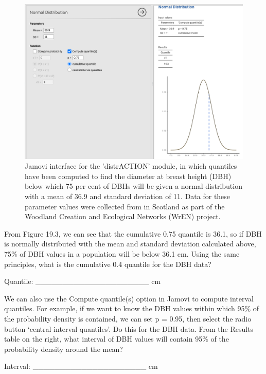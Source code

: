 \documentclass[
]{scrbook}
\begin{document}
\begin{figure}
\includegraphics[width=1\linewidth]{img/jamovi_distrACTION_p75} \caption{Jamovi interface for the 'distrACTION' module, in which quantiles have been computed to find the diameter at breast height (DBH) below which 75 per cent of DBHs will be given a normal distribution with a mean of 36.9 and standard deviation of 11. Data for these parameter values were collected from in Scotland as part of the Woodland Creation and Ecological Networks (WrEN) project.}\label{fig:unnamed-chunk-88}
\end{figure}

From Figure 19.3, we can see that the cumulative 0.75 quantile is 36.1, so if DBH is normally distributed with the mean and standard deviation calculated above, 75\% of DBH values in a population will be below 36.1 cm.
Using the same principles, what is the cumulative 0.4 quantile for the DBH data?

Quantile: \_\_\_\_\_\_\_\_\_\_\_\_\_\_\_\_\_\_\_\_\_ cm

We can also use the Compute quantile(s) option in Jamovi to compute interval quantiles.
For example, if we want to know the DBH values within which 95\% of the probability density is contained, we can set p = 0.95, then select the radio button `central interval quantiles'.
Do this for the DBH data.
From the Results table on the right, what interval of DBH values will contain 95\% of the probability density around the mean?

Interval: \_\_\_\_\_\_\_\_\_\_\_\_\_\_\_\_\_\_\_\_\_ cm
\end{document}
